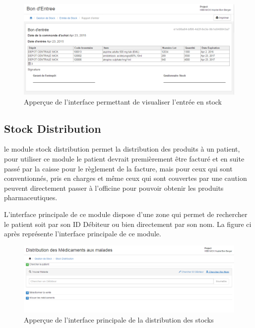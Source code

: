 \documentclass[12pt,a4paper]{report}
\begin{document}
\begin{figure}[h]
\begin{center}
\includegraphics[width=12cm]{pic/EntreStockEnter.png}
\end{center}
\caption{Apperçue de l'interface permettant de visualiser l'entrée en stock}
\label{Apperçue de l'interface permettant de visualiser l'entrée en stock}
\end{figure}

\subsection{Stock Distribution}
le module stock distribution permet la distribution des produits à un patient, pour utiliser ce module le patient devrait premièrement être facturé et en suite passé par la caisse pour le règlement de la facture, mais pour ceux qui sont conventionnés, pris en charges et même ceux qui sont couvertes par une caution peuvent directement passer à l'officine pour pouvoir obtenir les produits pharmaceutiques.

L'interface principale de ce module dispose d'une zone qui permet de rechercher le patient soit par son ID Débiteur ou bien directement par son nom. La figure ci après représente l'interface principale de ce module.

\begin{figure}[h]
\begin{center}
\includegraphics[width=12cm]{pic/DistrMediMalade.png}
\end{center}
\caption{Apperçue de l'interface principale de la distribution des stocks}
\label{Apperçue de l'interface principale de la distribution des stocks}
\end{figure}
\end{document}
